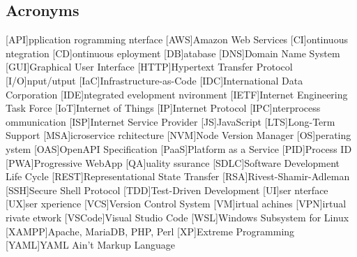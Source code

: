 \newcommand{\abbr}{Abbreviations}
\subsection{Acronyms}

\begin{acronym}[1234567890]		%
\setlength{\itemsep}{-\parsep}	%

[API]{pplication rogramming nterface}
[AWS]{Amazon Web Services}
[CI]{ontinuous ntegration}
[CD]{ontinuous eployment}
[DB]{atabase}
[DNS]{Domain Name System}
[GUI]{Graphical User Interface}
[HTTP]{Hypertext Transfer Protocol}
[I/O]{nput/utput}
[IaC]{Infrastructure-as-Code}
[IDC]{International Data Corporation}
[IDE]{ntegrated evelopment nvironment}
[IETF]{Internet Engineering Task Force}
[IoT]{Internet of Things}
[IP]{Internet Protocol}
[IPC]{nterprocess ommunication}
[ISP]{Internet Service Provider}
[JS]{JavaScript}
[LTS]{Long-Term Support}
[MSA]{icroservice rchitecture}
[NVM]{Node Version Manager}
[OS]{perating ystem}
[OAS]{OpenAPI Specification}
[PaaS]{Platform as a Service}
[PID]{Process ID}
[PWA]{Progressive WebApp}
[QA]{uality ssurance}
[SDLC]{Software Development Life Cycle}
[REST]{Representational State Transfer}
[RSA]{Rivest-Shamir-Adleman}
[SSH]{Secure Shell Protocol}
[TDD]{Test-Driven Development}
[UI]{ser nterface}
[UX]{ser xperience}
[VCS]{Version Control System}
[VM]{irtual achines}
[VPN]{irtual rivate etwork}
[VSCode]{Visual Studio Code}
[WSL]{Windows Subsystem for Linux}
[XAMPP]{Apache, MariaDB, PHP, Perl}
[XP]{Extreme Programming}
[YAML]{YAML Ain't Markup Language}
\end{acronym}
